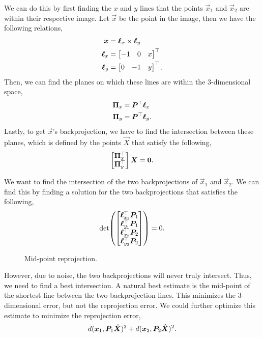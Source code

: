 We can do this by first finding the $x$ and $y$ lines that the points
$\vec{x}_1$ and $\vec{x}_2$ are within their respective image. Let $\vec{x}$ be
the point in the image, then we have the following relations,
\begin{align*}
    \bm{x}      & = \bm{\ell}_x \times \bm{\ell}_y                      \\
    \bm{\ell}_x & = \begin{bmatrix} -1 & 0 & x \end{bmatrix}^\top  \\
    \bm{\ell}_y & = \begin{bmatrix} 0 & -1 & y \end{bmatrix}^\top.
\end{align*}
Then, we can find the planes on which these lines are within the 3-dimensional
space,
\begin{align*}
    \bm{\Pi}_x & = \bm{P}^\top \bm{\ell}_x \\
    \bm{\Pi}_y & = \bm{P}^\top \bm{\ell}_y
    .\end{align*}
Lastly, to get $\vec{x}$'s backprojection, we have to find the intersection
between these planes, which is defined by the points $\vec{X}$ that satisfy the
following, \[
    \begin{bmatrix} \bm{\Pi}_x^\top \\ \bm{\Pi}_y^\top \end{bmatrix} \bm{X} = \bm{0}.
\]

We want to find the intersection of the two backprojections of $\vec{x}_1$ and
$\vec{x}_2$. We can find this by finding a solution for the two
backprojections that satisfies the following, \[
    \det{\begin{bmatrix} \transpose{\vec{\ell}_{x_1}} \mat{P}_1 \\ \transpose{\vec{\ell}_{y_1}} \mat{P}_1 \\ \transpose{\vec{\ell}_{x_2}} \mat{P}_2 \\ \transpose{\vec{\ell}_{y_2}} \mat{P}_2 \end{bmatrix}} = 0.
\]

\begin{figure}[t]
    \centering
    \caption{Mid-point reprojection.}
    \label{fig:mid-point-reprojection}
\end{figure}

However, due to noise, the two backprojections will never truly intersect.
Thus, we need to find a best intersection. A natural best estimate is the
mid-point of the shortest line between the two backprojection lines. This
minimizes the 3-dimensional error, but not the reprojection error. We could
further optimize this estimate to minimize the reprojection error, \[
    d(\bm{x}_1, \bm{P}_1 \hat{\bm{X}})^2 + d(\bm{x}_2, \bm{P}_2 \hat{\bm{X}})^2.
\]
